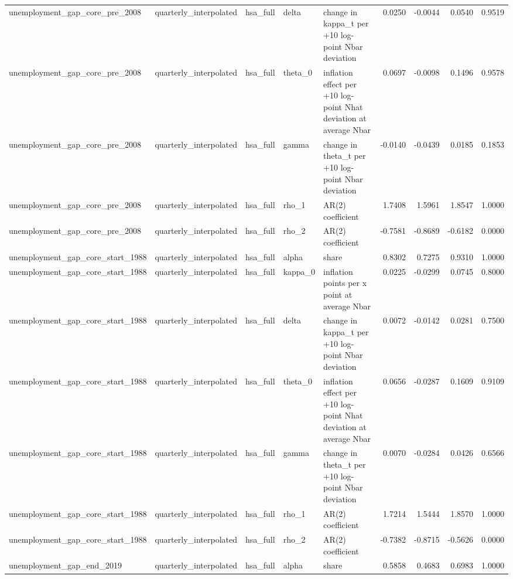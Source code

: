 \begin{tabular}{lllllrrrr}
unemployment\_gap\_core\_pre\_2008 & quarterly\_interpolated & hsa\_full & delta & change in kappa\_t per +10 log-point Nbar deviation & 0.0250 & -0.0044 & 0.0540 & 0.9519 \\
unemployment\_gap\_core\_pre\_2008 & quarterly\_interpolated & hsa\_full & theta\_0 & inflation effect per +10 log-point Nhat deviation at average Nbar & 0.0697 & -0.0098 & 0.1496 & 0.9578 \\
unemployment\_gap\_core\_pre\_2008 & quarterly\_interpolated & hsa\_full & gamma & change in theta\_t per +10 log-point Nbar deviation & -0.0140 & -0.0439 & 0.0185 & 0.1853 \\
unemployment\_gap\_core\_pre\_2008 & quarterly\_interpolated & hsa\_full & rho\_1 & AR(2) coefficient & 1.7408 & 1.5961 & 1.8547 & 1.0000 \\
unemployment\_gap\_core\_pre\_2008 & quarterly\_interpolated & hsa\_full & rho\_2 & AR(2) coefficient & -0.7581 & -0.8689 & -0.6182 & 0.0000 \\
unemployment\_gap\_core\_start\_1988 & quarterly\_interpolated & hsa\_full & alpha & share & 0.8302 & 0.7275 & 0.9310 & 1.0000 \\
unemployment\_gap\_core\_start\_1988 & quarterly\_interpolated & hsa\_full & kappa\_0 & inflation points per x point at average Nbar & 0.0225 & -0.0299 & 0.0745 & 0.8000 \\
unemployment\_gap\_core\_start\_1988 & quarterly\_interpolated & hsa\_full & delta & change in kappa\_t per +10 log-point Nbar deviation & 0.0072 & -0.0142 & 0.0281 & 0.7500 \\
unemployment\_gap\_core\_start\_1988 & quarterly\_interpolated & hsa\_full & theta\_0 & inflation effect per +10 log-point Nhat deviation at average Nbar & 0.0656 & -0.0287 & 0.1609 & 0.9109 \\
unemployment\_gap\_core\_start\_1988 & quarterly\_interpolated & hsa\_full & gamma & change in theta\_t per +10 log-point Nbar deviation & 0.0070 & -0.0284 & 0.0426 & 0.6566 \\
unemployment\_gap\_core\_start\_1988 & quarterly\_interpolated & hsa\_full & rho\_1 & AR(2) coefficient & 1.7214 & 1.5444 & 1.8570 & 1.0000 \\
unemployment\_gap\_core\_start\_1988 & quarterly\_interpolated & hsa\_full & rho\_2 & AR(2) coefficient & -0.7382 & -0.8715 & -0.5626 & 0.0000 \\
unemployment\_gap\_end\_2019 & quarterly\_interpolated & hsa\_full & alpha & share & 0.5858 & 0.4683 & 0.6983 & 1.0000 \\

\end{tabular}
